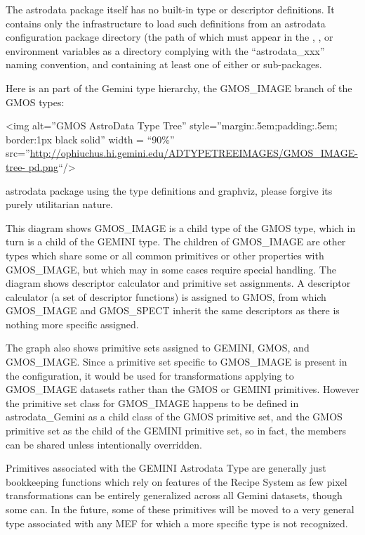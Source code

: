 \documentclass[letterpaper,10pt,english]{sphinxmanual}
\begin{document}
The astrodata package itself has no built-in type or descriptor
definitions. It contains only the infrastructure to load such
definitions from an astrodata configuration package directory (the
path of which must appear in the , , or
 environment variables as a directory complying with
the ``astrodata\_xxx'' naming convention, and containing at least one of
either  or  sub-packages.

Here is an part of the Gemini type hierarchy, the GMOS\_IMAGE branch of
the GMOS types:

\textless{}img alt=''GMOS AstroData Type Tree'' style=''margin:.5em;padding:.5em;
border:1px black solid'' width = ``90\%''
src=''\href{http://ophiuchus.hi.gemini.edu/ADTYPETREEIMAGES/GMOS\_IMAGE-tree-pd.png}{http://ophiuchus.hi.gemini.edu/ADTYPETREEIMAGES/GMOS\_IMAGE-tree-
pd.png}``/\textgreater{}

astrodata package using the type definitions and graphviz, please
forgive its purely utilitarian nature.

This diagram shows GMOS\_IMAGE is a child type of the GMOS type, which
in turn is a child of the GEMINI type. The children of GMOS\_IMAGE are
other types which share some or all common primitives or other
properties with GMOS\_IMAGE, but which may in some cases require
special handling. The diagram shows descriptor calculator and
primitive set assignments. A descriptor calculator (a set of
descriptor functions) is assigned to GMOS, from which GMOS\_IMAGE and
GMOS\_SPECT inherit the same descriptors as there is nothing more
specific assigned.

The graph also shows primitive sets assigned to GEMINI, GMOS, and
GMOS\_IMAGE. Since a primitive set specific to GMOS\_IMAGE is present in
the configuration, it would be used for transformations applying to
GMOS\_IMAGE datasets rather than the GMOS or GEMINI primitives. However
the primitive set class for GMOS\_IMAGE happens to be defined in
astrodata\_Gemini as a child class of the GMOS primitive set, and the
GMOS primitive set as the child of the GEMINI primitive set, so in
fact, the members can be shared unless intentionally overridden.

Primitives associated with the GEMINI Astrodata Type are generally
just bookkeeping functions which rely on features of the Recipe System
as few pixel transformations can be entirely generalized across all
Gemini datasets, though some can. In the future, some of these
primitives will be moved to a very general type associated with any
MEF for which a more specific type is not recognized.



\renewcommand{\indexname}{Index}
\printindex
\end{document}
